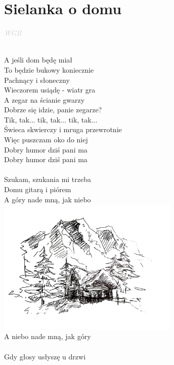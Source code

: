 \documentclass[a5paper, 10pt]{book}
\begin{document}
\section{Sielanka o domu}\textcolor{lightgray}{\textit{WGB}}\\~\\
\begin{minipage}[t]{0.65\textwidth}
A jeśli dom będę miał\\
To będzie bukowy koniecznie\\
Pachnący i słoneczny\\
Wieczorem usiądę - wiatr gra\\
A zegar na ścianie gwarzy\\
Dobrze się idzie, panie zegarze?\\
Tik, tak... tik, tak... tik, tak...\\
Świeca skwierczy i mruga przewrotnie\\
Więc puszczam oko do niej\\
Dobry humor dziś pani ma\\
Dobry humor dziś pani ma\\
\\
\hspace*{6mm}Szukam, szukania mi trzeba\\
\hspace*{6mm}Domu gitarą i piórem\\
\hspace*{6mm}A góry nade mną, jak niebo\\
\hspace*{5.5cm}\includegraphics[height=6.5cm]{images/sielanka_o_domu.png}\vspace*{-6.6cm}\\
\hspace*{6mm}A niebo nade mną, jak góry\\
\\
Gdy głosy usłyszę u drzwi\\

\end{minipage}
\end{document}
